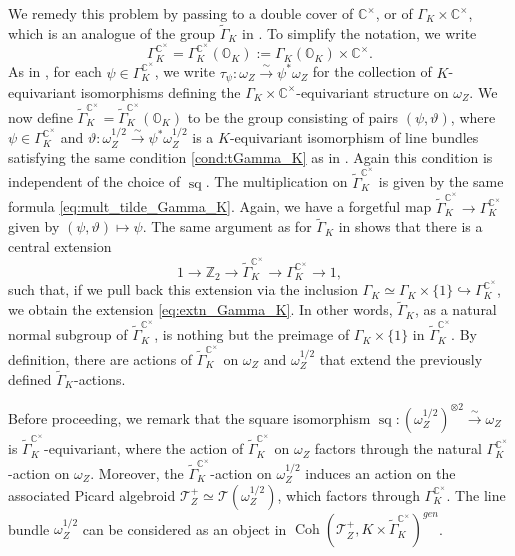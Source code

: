 \documentclass[11pt, a4paper]{amsart}
\newcommand{\C}{\mathbb{C}}
\newcommand{\orb}{\mathbb{O}}
\newcommand{\orbk}{\orb_{K}}
\newcommand{\Z}{\mathbb{Z}}
\newcommand{\tGamma}{\widetilde{\Gamma}}
\DeclareMathOperator{\sq}{sq}
\DeclareMathOperator{\Coh}{Coh}
\newcommand{\smallhalf}{{\scriptscriptstyle 1/2}}
\newcommand{\TT}{\mathscr{T}}
\newcommand{\cm}{\C^\times}
\theoremstyle{definition}
\numberwithin{equation}{section}
\begin{document}
We remedy this problem by passing to a double cover of $\cm$, or of $\Gamma_K \times \cm$, which is an analogue of the group $\tGamma_K$ in . To simplify the notation, we write 
\[
	\Gamma_K^{\cm} = \Gamma_K^{\cm}(\orbk) := \Gamma_K(\orbk) \times \cm.
\]
As in , for each $\psi \in \Gamma_K^{\cm}$, we write 
$\tau_\psi: \omega_Z \xrightarrow{\sim} \psi^* \omega_Z$
for the collection of $K$-equivariant isomorphisms defining the $\Gamma_K \times \cm$-equivariant structure on $\omega_Z$.
We now define $\tGamma_K^{\cm} = \tGamma_K^{\cm}(\orbk)$ to be the group consisting of pairs $(\psi, \vartheta)$, where $\psi \in \Gamma_K^{\cm}$ and $\vartheta: \omega_Z^{\smallhalf} \xrightarrow{\sim} \psi^* \omega_Z^{\smallhalf}$ is a $K$-equivariant isomorphism of line bundles satisfying the same condition \ref{cond:tGamma_K} as in . Again this condition is independent of the choice of $\sq$. The multiplication on $\tGamma_K^{\cm}$ is given by the same formula \eqref{eq:mult_tilde_Gamma_K}. Again, we have a forgetful map $\tGamma_K^{\cm} \to \Gamma_K^{\cm}$ given by $(\psi, \vartheta) \mapsto \psi$. The same argument as for $\tGamma_K$ in  shows that there is a central extension
	\begin{equation} \label{eq:extn_Gamma_K_cm}
		1 \to \Z_2 \to \tGamma_K^{\cm} \to \Gamma_K^{\cm} \to 1,
	\end{equation}
such that, if we pull back this extension via the inclusion $\Gamma_K \simeq \Gamma_K \times \{1\} \hookrightarrow \Gamma_K^{\cm}$, we obtain the extension \eqref{eq:extn_Gamma_K}. In other words, $\tGamma_K$, as a natural normal subgroup of $\tGamma_K^{\cm}$, is nothing but the preimage of $\Gamma_K \times \{1\}$ in $\tGamma_K^{\cm}$. By definition, there are actions of $\tGamma_K^{\cm}$ on $\omega_Z$ and $\omega_Z^{\smallhalf}$ that extend the previously defined $\tGamma_K$-actions.

Before proceeding, we remark that the square isomorphism $\sq: (\omega_Z^{\smallhalf})^{\otimes 2} \xrightarrow{\sim} \omega_Z$ is $\tGamma_K^{\cm}$-equivariant, where the action of $\tGamma_K^{\cm}$ on $\omega_Z$ factors through the natural $\Gamma_K^{\cm}$-action on $\omega_Z$. Moreover, the $\tGamma_K^{\cm}$-action on $\omega_Z^{\smallhalf}$ induces an action on the associated Picard algebroid $\TT^+_Z \simeq \TT(\omega_Z^{\smallhalf})$, which factors through $\Gamma_K^{\cm}$. %
The line bundle $\omega_Z^{\smallhalf}$ can be considered as an object in $\Coh(\TT^+_Z, K \times \tGamma_K^{\cm})^{gen}$.
\end{document}

